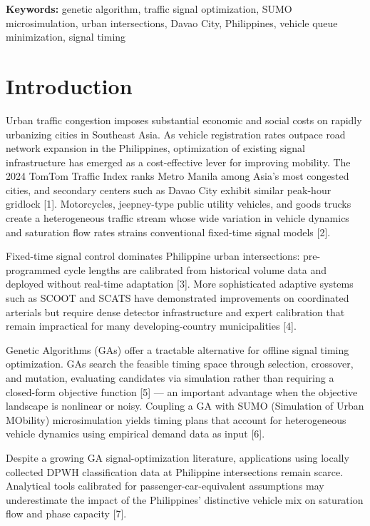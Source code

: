 \documentclass[a4paper,10pt]{article}
\begin{document}
	\vspace{6pt}
	
	\noindent\textbf{Keywords:} genetic algorithm, traffic signal optimization, SUMO microsimulation, urban intersections, Davao City, Philippines, vehicle queue minimization, signal timing
	
	\section{Introduction}
	
	Urban traffic congestion imposes substantial economic and social costs on rapidly urbanizing cities in Southeast Asia. As vehicle registration rates outpace road network expansion in the Philippines, optimization of existing signal infrastructure has emerged as a cost-effective lever for improving mobility. The 2024 TomTom Traffic Index ranks Metro Manila among Asia's most congested cities, and secondary centers such as Davao City exhibit similar peak-hour gridlock [1]. Motorcycles, jeepney-type public utility vehicles, and goods trucks create a heterogeneous traffic stream whose wide variation in vehicle dynamics and saturation flow rates strains conventional fixed-time signal models [2].
	
	Fixed-time signal control dominates Philippine urban intersections: pre-programmed cycle lengths are calibrated from historical volume data and deployed without real-time adaptation [3]. More sophisticated adaptive systems such as SCOOT and SCATS have demonstrated improvements on coordinated arterials but require dense detector infrastructure and expert calibration that remain impractical for many developing-country municipalities [4].
	
	Genetic Algorithms (GAs) offer a tractable alternative for offline signal timing optimization. GAs search the feasible timing space through selection, crossover, and mutation, evaluating candidates via simulation rather than requiring a closed-form objective function [5] --- an important advantage when the objective landscape is nonlinear or noisy. Coupling a GA with SUMO (Simulation of Urban MObility) microsimulation yields timing plans that account for heterogeneous vehicle dynamics using empirical demand data as input [6].
	
	Despite a growing GA signal-optimization literature, applications using locally collected DPWH classification data at Philippine intersections remain scarce. Analytical tools calibrated for passenger-car-equivalent assumptions may underestimate the impact of the Philippines' distinctive vehicle mix on saturation flow and phase capacity [7].
\end{document}

